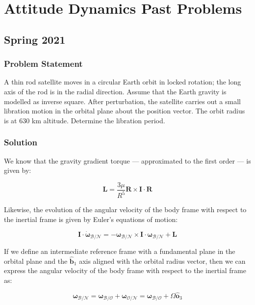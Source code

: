 \documentclass[
]{article}
\let\oldsection\section
\renewcommand\section{\clearpage\oldsection}
\begin{document}
\section{Attitude Dynamics Past
Problems}\label{attitude-dynamics-past-problems}

\subsection{Spring 2021}\label{spring-2021-1}

\subsubsection{Problem Statement}\label{problem-statement-4}

A thin rod satellite moves in a circular Earth orbit in locked rotation;
the long axis of the rod is in the radial direction. Assume that the
Earth gravity is modelled as inverse square. After perturbation, the
satellite carries out a small libration motion in the orbital plane
about the position vector. The orbit radius is at \(630\) km altitude.
Determine the libration period.

\subsubsection{Solution}\label{solution-4}

We know that the gravity gradient torque --- approximated to the first
order --- is given by:

\[\boldsymbol{L} = \frac{3\mu}{R^5} \boldsymbol{R} \times \boldsymbol{I} \cdot \boldsymbol{R}\]

Likewise, the evolution of the angular velocity of the body frame with
respect to the inertial frame is given by Euler's equations of motion:

\[\boldsymbol{I} \cdot \dot{\boldsymbol{\omega}}_\mathcal{B/N} = -\boldsymbol{\omega}_\mathcal{B/N} \times \boldsymbol{I} \cdot \boldsymbol{\omega}_\mathcal{B/N} + \boldsymbol{L}\]

If we define an intermediate reference frame with a fundamental plane in
the orbital plane and the \(\hat{\boldsymbol{b}}_1\) axis aligned with
the orbital radius vector, then we can express the angular velocity of
the body frame with respect to the inertial frame as:

\[\boldsymbol{\omega}_\mathcal{B/N} = \boldsymbol{\omega}_\mathcal{B/O} + \boldsymbol{\omega}_\mathcal{O/N} =\boldsymbol{\omega}_\mathcal{B/O} + \Omega \hat{\boldsymbol{o}}_3\]
\end{document}
